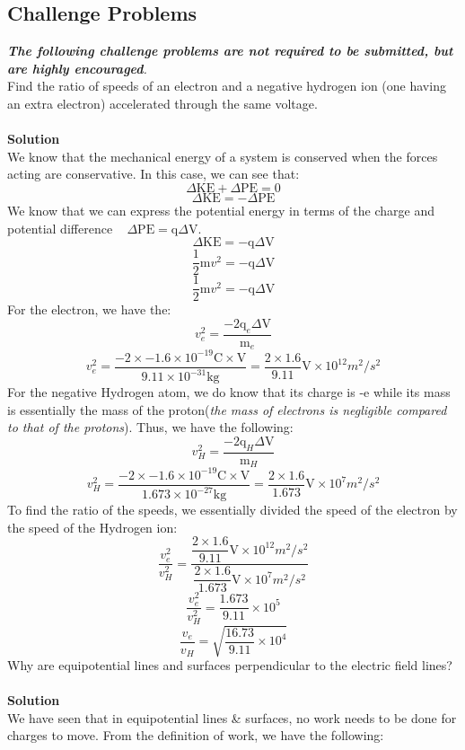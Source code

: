 \documentclass[9pt,addpoints]{exam}
\begin{document}
\begin{questions}
		\subsection*{Challenge Problems}
		\textit{\textbf{The following challenge problems are not required to be submitted, but are highly encouraged}.} \\
		\question Find the ratio of speeds of an electron and a negative hydrogen ion (one having an extra electron) accelerated through the same voltage.\\ \\
		\textbf{Solution}\\	
		We know that the mechanical energy of a system is conserved when the forces acting are conservative. In this case, we can see that:
		$$\Delta\text{KE}+\Delta\text{PE}=0$$
		$$\Delta\text{KE}=-\Delta\text{PE}$$
		We know that we can express the potential energy in terms of the charge and potential difference ~ $\Delta\text{PE}=\text{q}\Delta\text{V}$.
		$$\Delta\text{KE}=-\text{q}\Delta\text{V}$$
		$$\dfrac{1}{2}\text{m}v^2=-\text{q}\Delta\text{V}$$
		$$\dfrac{1}{2}\text{m}v^2=-\text{q}\Delta\text{V}$$
		For the electron, we have the:		
		$$v_e^2=\dfrac{-2\text{q}_e\Delta\text{V}}{\text{m}_e}$$
		$$v_e^2=\dfrac{-2\times-1.6\times10^{-19}\text{C}\times\text{V}}{9.11\times10^{-31}\text{kg}}=\dfrac{2\times1.6}{9.11}\text{V}\times10^{12}m^2/s^2$$
		For the negative Hydrogen atom, we do know that its charge is -e while its mass is essentially the mass of the proton(\textit{the mass of electrons is negligible compared to that of the protons}). Thus, we have the following:
		$$v_H^2=\dfrac{-2\text{q}_H\Delta\text{V}}{\text{m}_H}$$ 
		$$v_H^2=\dfrac{-2\times-1.6\times10^{-19}\text{C}\times\text{V}}{1.673\times10^{-27}\text{kg}}=\dfrac{2\times1.6}{1.673}\text{V}\times10^{7}m^2/s^2$$
		To find the ratio of the speeds, we essentially divided the speed of the electron by the speed of the Hydrogen ion:
		$$\dfrac{v_e^2}{v_H^2}=\dfrac{\dfrac{2\times1.6}{9.11}\text{V}\times10^{12}m^2/s^2}{\dfrac{2\times1.6}{1.673}\text{V}\times10^{7}m^2/s^2}$$
		$$\dfrac{v_e^2}{v_H^2}=\dfrac{1.673}{9.11}\times10^5$$
		$$\dfrac{v_e}{v_H}=\sqrt{\dfrac{16.73}{9.11}\times10^4}$$
		\question Why are equipotential lines and surfaces perpendicular to the electric field lines?\\ \\
		\textbf{Solution}\\
		We have seen that in equipotential lines \& surfaces, no work needs to be done for charges to move. From the definition of work, we have the following:

\end{questions}
\end{document}
